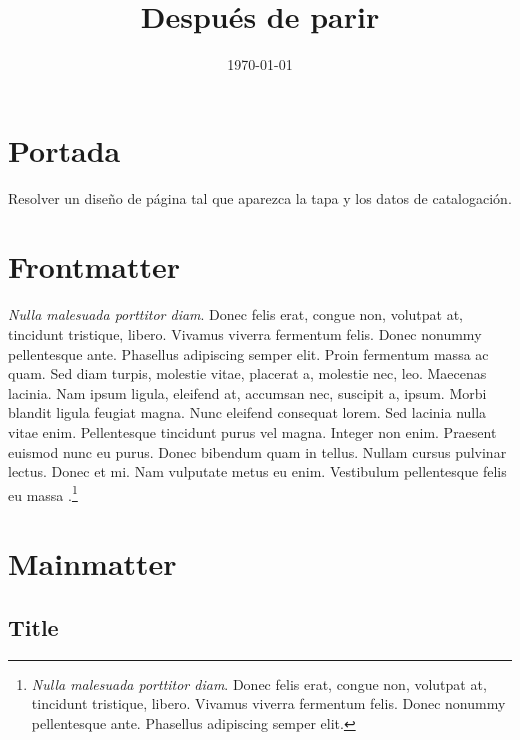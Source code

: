 \documentclass{book}
\title{Después de parir} %
\date{\today}
\begin{document}
\frontmatter


\maketitle

\tableofcontents

\chapter{Portada}

Resolver un diseño de página tal que aparezca la tapa y los datos de catalogación.

\chapter{Frontmatter}

\lipsum[1]

\emph{Nulla malesuada porttitor diam}. Donec felis erat, congue non, volutpat at, tincidunt tristique, libero. Vivamus viverra fermentum felis. Donec nonummy pellentesque ante. Phasellus adipiscing semper elit. Proin fermentum massa ac quam. Sed diam turpis, molestie vitae, placerat a, molestie nec, leo. Maecenas lacinia. Nam ipsum ligula, eleifend at, accumsan nec, suscipit a, ipsum. Morbi blandit ligula feugiat magna. Nunc eleifend consequat lorem. Sed lacinia nulla vitae enim. Pellentesque tincidunt purus vel magna. Integer non enim. Praesent euismod nunc eu purus. Donec bibendum quam in tellus. Nullam cursus pulvinar lectus. Donec et mi. Nam vulputate metus eu enim. Vestibulum pellentesque felis eu massa \parencite{@940-SHUMWAY1999}.\footnote{\emph{Nulla malesuada porttitor diam}. Donec felis erat, congue non, volutpat at, tincidunt tristique, libero. Vivamus viverra fermentum felis. Donec nonummy pellentesque ante. Phasellus adipiscing semper elit.}

\lipsum[1]

\mainmatter

\chapter{Mainmatter}
\label{mychapter}

\lipsum[1]

\section{Title}
\end{document}
